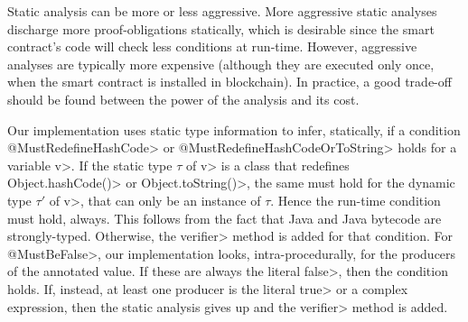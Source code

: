 Static analysis can be more or less aggressive.
More aggressive static analyses discharge more proof-obligations statically,
which is desirable since the smart contract's code will check less
conditions at run-time. However, aggressive analyses are typically more expensive
(although they are executed only once, when the smart contract is installed in
blockchain). In practice, a good trade-off should be found between the power of the analysis
and its cost.

Our implementation uses static type information to infer, statically, if a condition
\<@MustRedefineHashCode> or \<@MustRedefineHashCodeOrToString> holds for a variable \<v>.
If the static type
$\tau$ of \<v> is a class that redefines \<Object.hashCode()> or \<Object.toString()>,
the same must hold for the dynamic type $\tau'$ of \<v>, that can only be an
instance of $\tau$. Hence the run-time condition must hold, always.
This follows from the fact that Java and Java bytecode
are strongly-typed. Otherwise, the \<verifier> method is added for that condition.
For \<@MustBeFalse>, our implementation looks, intra-procedurally, for
the producers of the annotated value.
If these are always the literal \<false>, then the condition holds.
If, instead, at least one producer is the literal \<true> or a complex expression,
then the static analysis gives up and the \<verifier> method is added.
